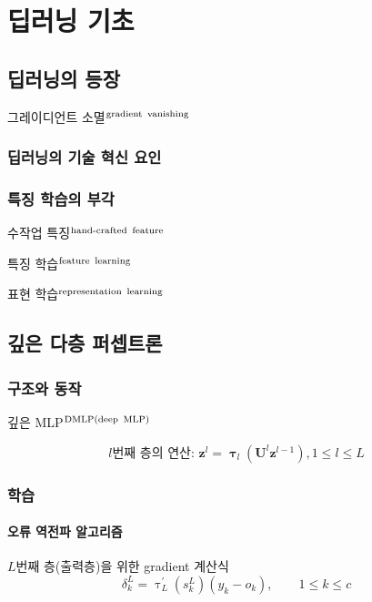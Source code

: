 \documentclass [12pt] {oblivoir}
\let\oldsubsubsection=\subsubsection
\renewcommand{\subsubsection}
{
  \filbreak
  \oldsubsubsection
}
\begin{document}
\newpage
\section{딥러닝 기초}

\subsection{딥러닝의 등장}

그레이디언트 소멸$^{\text{gradient\, vanishing}}$

\subsubsection{딥러닝의 기술 혁신 요인}

\subsubsection{특징 학습의 부각}

수작업 특징$^{\text{hand-crafted\, feature}}$

특징 학습$^{\text{feature\, learning}}$

표현 학습$^{\text{representation\, learning}}$

\subsection{깊은 다층 퍼셉트론}

\subsubsection{구조와 동작}

깊은 MLP$^{\text{DMLP(deep\, MLP)}}$

\begin{equation} \tag{4.5}
  l\text{번째 층의 연산: } \mathbf{z}^{l} = \boldsymbol{\uptau}_{l}(\mathbf{U}^{l}\mathbf{z}^{l-1}), 1 \le l \le L
\end{equation}

\subsubsection{학습}

\paragraph*{오류 역전파 알고리즘}\mbox{}
$L$번째 층(출력층)을 위한 gradient 계산식
\begin{equation} \tag{4.6}
  \delta_{k}^{L} = \uptau_{L}^{'}(s_{k}^{L})(y_{k} - o_{k}), \qquad 1 \le k \le c
\end{equation}
\end{document}
